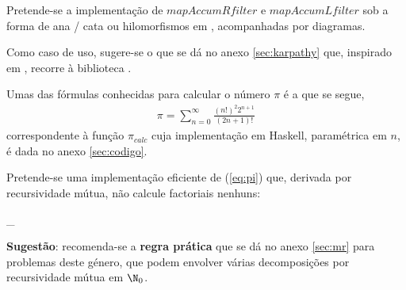 \documentclass[11pt, a4paper, fleqn]{article}
\newcommand{\Varid}[1]{\mathit{#1}}
\def\resethooks{%
  \global\let\SaveRestoreHook\empty
  \global\let\ColumnHook\empty}
\let\hspre\empty
\let\hspost\empty
\begin{document}
Pretende-se a implementação de \ensuremath{\Varid{mapAccumRfilter}} e \ensuremath{\Varid{mapAccumLfilter}} sob a forma de ana / cata ou hilomorfismos em \Haskell, acompanhadas por diagramas.

Como caso de uso, sugere-se o que se dá no anexo \ref{sec:karpathy} que, inspirado em \cite{Ka15}, recorre à biblioteca \DataMatrix.

\Problema

Umas das fórmulas conhecidas para calcular o número \ensuremath{\pi } é a que se segue,
\begin{eqnarray}
	\ensuremath{\pi } = \sum_{n=0}^\infty \frac{(n!)^2 {2^{n+1}}}{(2n+1)!}
	\label{eq:pi}
\end{eqnarray}
correspondente à função \ensuremath{\pi_{\mathit{calc}}} cuja implementação em Haskell, paramétrica em \ensuremath{\Varid{n}}, é dada no anexo \ref{sec:codigo}.

Pretende-se uma implementação eficiente de (\ref{eq:pi}) que, derivada por recursividade mútua,
não calcule factoriais nenhuns:
\begin{hscode}\SaveRestoreHook
\column{B}{@{}>{\hspre}l<{\hspost}@{}}%
\column{E}{@{}>{\hspre}l<{\hspost}@{}}%
\>[B]{}\pi_{}\mathrel{=}\cdots \comp \for{\Varid{loop}}\ {\Varid{inic}}\;\;\cdots {}\<[E]%
\ColumnHook
\end{hscode}\resethooks
\textbf{Sugestão}: recomenda-se a \textbf{regra prática} que se dá no anexo \ref{sec:mr}
para problemas deste género, que podem envolver várias decomposições por recursividade
mútua em \ensuremath{\N_0}.

\RNNs
\end{document}
